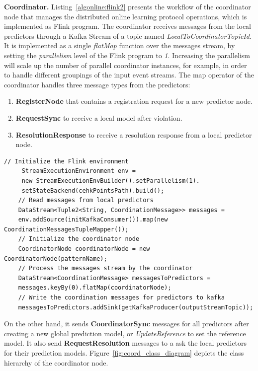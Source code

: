 \textbf{Coordinator.} Listing~\ref{algonline:flink2} presents the workflow of the coordinator node that manages the distributed online learning protocol operations, which is implemented as Flink program. The coordinator receives messages from the local predictors through a Kafka Stream of a topic named \textit{LocalToCoordinatorTopicId}. It is implemented as a single \textit{flatMap} function over the messages stream, by setting the \textit{parallelism} level of the Flink program to \textit{1}. Increasing the parallelism will scale up the number of parallel coordinator instances, for example, in order to handle different groupings of the input event streams. The map operator of the coordinator  handles three message types from the predictors: \begin{enumerate}[]
	\item \textbf{RegisterNode} that contains  a registration request for a new predictor node.
	\item \textbf{RequestSync} to receive a local model after violation.
	\item \textbf{ResolutionResponse} to receive a resolution response from a local predictor node.  
\end{enumerate}  

\begin{center}
	\centering
\begin{lstlisting}[caption={The coordinator Flink program.},label={algonline:flink2},frame=single]
	// Initialize the Flink environment	 
	 StreamExecutionEnvironment env =
	 new StreamExecutionEnvBuilder().setParallelism(1).
	 setStateBackend(cehkPointsPath).build();	 
	// Read messages from local predictors
	DataStream<Tuple2<String, CoordinationMessage>> messages =
	env.addSource(initKafkaConsumer()).map(new CoordinationMessagesTupleMapper());	
	// Initialize the coordinator node
	CoordinatorNode coordinatorNode = new CoordinatorNode(patternName);	
	// Process the messages stream by the coordinator
	DataStream<CoordinationMessage> messagesToPredictors =
	messages.keyBy(0).flatMap(coordinatorNode);	
	// Write the coordination messages for predictors to kafka
	messagesToPredictors.addSink(getKafkaProducer(outputStreamTopic));

\end{lstlisting}
\end{center}

 On the other hand, it sends \textbf{CoordinatorSync} messages for all predictors after creating a new global prediction model, or \textit{UpdateReference} to set the reference model. It also send  \textbf{RequestResolution} messages to a ask the local predictors for their prediction models. Figure~\ref{fig:coord_class_diagram} depicts the  class hierarchy of the coordinator node.
 
